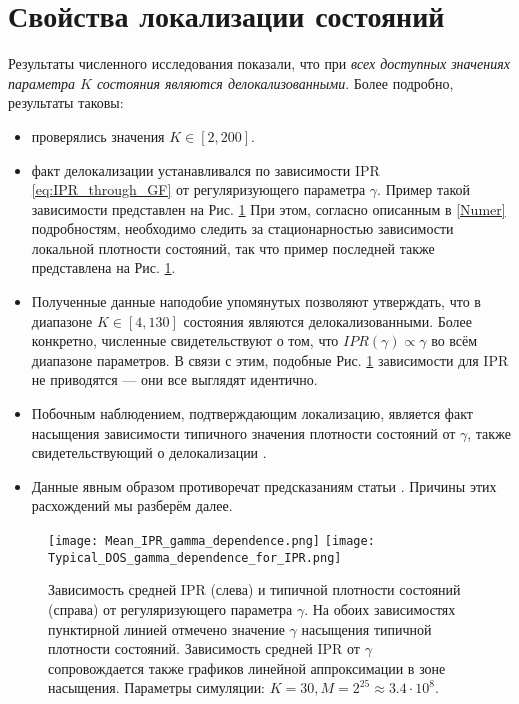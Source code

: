 \section{Свойства локализации состояний}
Результаты численного исследования показали, что при \textit{всех доступных значениях параметра $K$ состояния являются делокализованными}. Более подробно, результаты таковы:
\begin{itemize}
	\item проверялись значения $K \in [2, 200]$.
	\item факт делокализации устанавливался по зависимости IPR \eqref{eq:IPR_through_GF} от регуляризующего параметра $\gamma$. Пример такой зависимости представлен на Рис. \ref{fig:IPR_and_DOS_dependence_from_gamma} При этом, согласно описанным в \autoref{Numer} подробностям, необходимо следить за стационарностью зависимости локальной плотности состояний, так что пример последней также представлена на Рис. \ref{fig:IPR_and_DOS_dependence_from_gamma}.
	\item Полученные данные наподобие упомянутых позволяют утверждать, что в диапазоне $K \in [4, 130]$ состояния являются делокализованными. Более конкретно, численные свидетельствуют о том, что $IPR(\gamma) \propto \gamma$ во всём диапазоне параметров. В связи с этим, подобные Рис. \ref{fig:IPR_and_DOS_dependence_from_gamma} зависимости для IPR не приводятся --- они все выглядят идентично.
	\item Побочным наблюдением, подтверждающим локализацию, является факт насыщения зависимости типичного значения плотности состояний от $\gamma$, также свидетельствующий о делокализации \cite{AAT}.
	\item Данные явным образом противоречат предсказаниям статьи \cite{FI_microwave}. Причины этих расхождений мы разберём далее.
\end{itemize}

\begin{figure}[h!]
	\label{fig:IPR_and_DOS_dependence_from_gamma}
	\centering
	\texttt{[image: Mean\_IPR\_gamma\_dependence.png]}
	\texttt{[image: Typical\_DOS\_gamma\_dependence\_for\_IPR.png]}
	\caption{Зависимость средней IPR (слева) и типичной плотности состояний (справа) от регуляризующего параметра $\gamma$. На обоих зависимостях пунктирной линией отмечено значение $\gamma$ насыщения типичной плотности состояний. Зависимость средней IPR от $\gamma$ сопровождается также графиков линейной аппроксимации в зоне насыщения. Параметры симуляции: $K = 30, M = 2^{25} \approx 3.4 \cdot 10^{8}$.}
\end{figure}



